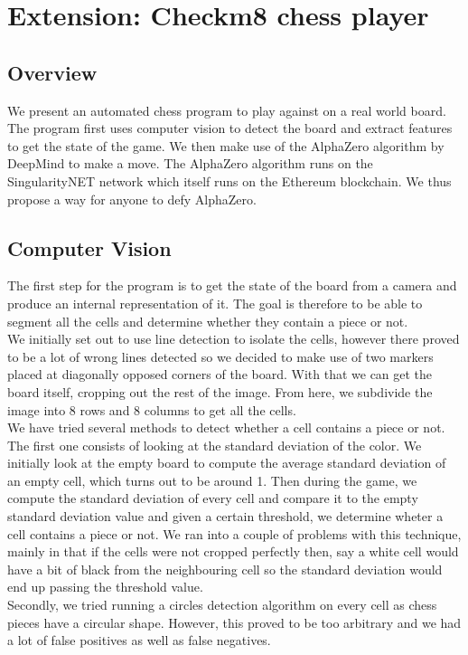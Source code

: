 \documentclass[11pt]{article}
\begin{document}
\section{Extension: Checkm8 chess player}

\subsection{Overview}

We present an automated chess program to play against on a real world board. The
program first uses computer vision to detect the board and extract features to
get the state of the game. We then make use of the AlphaZero algorithm by
DeepMind to make a move. The AlphaZero algorithm runs on the SingularityNET
network which itself runs on the Ethereum blockchain. We thus propose a way for
anyone to defy AlphaZero.

\subsection{Computer Vision}

The first step for the program is to get the state of the board from a camera
and produce an internal representation of it. The goal is therefore to be able
to segment all the cells and determine whether they contain a piece or not.\\ We
initially set out to use line detection to isolate the cells, however there
proved to be a lot of wrong lines detected so we decided to make use of two
markers placed at diagonally opposed corners of the board. With that we can get
the board itself, cropping out the rest of the image. From here, we subdivide
the image into 8 rows and 8 columns to get all the cells.\\ We have tried
several methods to detect whether a cell contains a piece or not. The first one
consists of looking at the standard deviation of the color. We initially look at
the empty board to compute the average standard deviation of an empty cell,
which turns out to be around 1. Then during the game, we compute the standard
deviation of every cell and compare it to the empty standard deviation value and
given a certain threshold, we determine wheter a cell contains a piece or not.
We ran into a couple of problems with this technique, mainly in that if the
cells were not cropped perfectly then, say a white cell would have a bit of
black from the neighbouring cell so the standard deviation would end up passing
the threshold value.\\
Secondly, we tried running a circles detection algorithm on every cell as chess
pieces have a circular shape. However, this proved to be too arbitrary and we
had a lot of false positives as well as false negatives.
\end{document}
